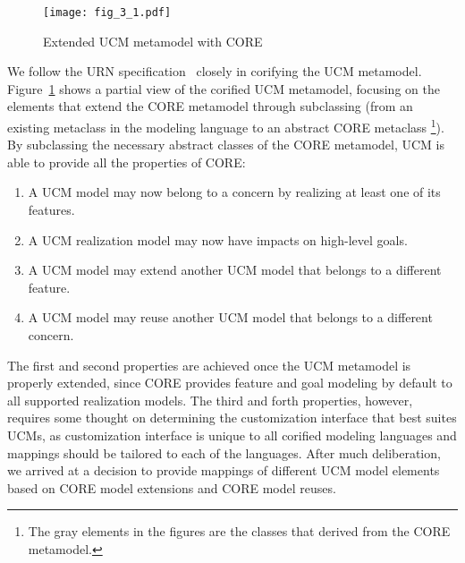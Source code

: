 \begin{figure}
	\centering
	\texttt{[image: fig\_3\_1.pdf]}
	\caption{Extended UCM metamodel with CORE}
	\label{fig:3.1}
\end{figure}

We follow the URN specification~\cite{itu2012151} closely in corifying the UCM metamodel. Figure~\ref{fig:3.1} shows a partial view of the corified UCM metamodel, focusing on the elements that extend the CORE metamodel through subclassing (from an existing metaclass in the modeling language to an abstract CORE metaclass \footnote{The gray elements in the figures are the classes that derived from the CORE metamodel.}). By subclassing the necessary abstract classes of the CORE metamodel, UCM is able to provide all the properties of CORE:

\begin{enumerate}
	\setlength{\parskip}{0pt} \setlength{\itemsep}{0pt}
	\item A UCM model may now belong to a concern by realizing at least one of its features.
	\item A UCM realization model may now have impacts on high-level goals.
	\item A UCM model may extend another UCM model that belongs to a different feature.
	\item A UCM model may reuse another UCM model that belongs to a different concern.
\end{enumerate}

The first and second properties are achieved once the UCM metamodel is properly extended, since CORE provides feature and goal modeling by default to all supported realization models. The third and forth properties, however, requires some thought on determining the customization interface that best suites UCMs, as customization interface is unique to all corified modeling languages and mappings should be tailored to each of the languages. After much deliberation, we arrived at a decision to provide mappings of different UCM model elements based on CORE model extensions and CORE model reuses.

